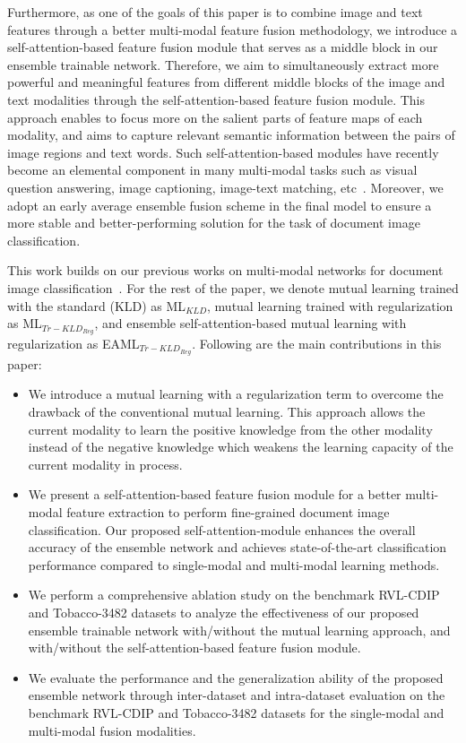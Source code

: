 \documentclass[twocolumn]{svjour3}
\begin{document}
Furthermore, as one of the goals of this paper is to combine image and text features through a better multi-modal feature fusion methodology, we introduce a self-attention-based feature fusion module that serves as a middle block in our ensemble trainable network. 
Therefore, we aim to simultaneously extract more powerful and meaningful features from different middle blocks of the image and text modalities through the self-attention-based feature fusion module. This approach enables to focus more on the salient parts of feature maps of each modality, and aims to capture relevant semantic information between the pairs of image regions and text words. 
Such self-attention-based modules have recently become an elemental component in many multi-modal tasks such as visual question answering, image captioning, image-text matching, etc~\cite{NEURIPS2018_96ea64f3, Nguyen2018ImprovedFO, Yan2020ImageCV, Lee2018StackedCA}. Moreover, we adopt an early average ensemble fusion scheme in the final model to ensure a more stable and better-performing solution for the task of document image classification.

This work builds on our previous works on multi-modal networks for document image classification~\cite{souhailbakkali, 9191268}. For the rest of the paper, we denote mutual learning trained with the standard (KLD) as ML$_{KLD}$, mutual learning trained with regularization as ML$_{{Tr-KLD}_{Reg}}$, and ensemble self-attention-based mutual learning with regularization as EAML$_{{Tr-KLD}_{Reg}}$.
Following are the main contributions in this paper:

\begin{itemize}
    \item We introduce a mutual learning with a regularization term to overcome the drawback of the conventional mutual learning. This approach allows the current modality to learn the positive knowledge from the other modality instead of the negative knowledge which weakens the learning capacity of the current modality in process.
    
    \item We present a self-attention-based feature fusion module for a better multi-modal feature extraction to perform fine-grained document image classification. Our proposed self-attention-module enhances the overall accuracy of the ensemble network and achieves state-of-the-art classification performance compared to single-modal and multi-modal learning methods. 
    
    \item We perform a comprehensive ablation study on the benchmark RVL-CDIP and Tobacco-3482 datasets to analyze the effectiveness of our proposed ensemble trainable network with/without the mutual learning approach, and with/without the self-attention-based feature fusion module.
    
    \item We evaluate the performance and the generalization ability of the proposed ensemble network through inter-dataset and intra-dataset evaluation on the benchmark RVL-CDIP and Tobacco-3482 datasets for the single-modal and multi-modal fusion modalities.
\end{itemize}
\end{document}
